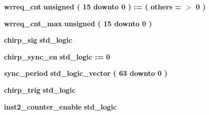\begin{DoxyCompactItemize}
\item 
{\bf wrreq\+\_\+cnt} {\bfseries \textcolor{comment}{unsigned}\textcolor{vhdlchar}{ }\textcolor{vhdlchar}{(}\textcolor{vhdlchar}{ }\textcolor{vhdlchar}{ } \textcolor{vhdldigit}{15} \textcolor{vhdlchar}{ }\textcolor{keywordflow}{downto}\textcolor{vhdlchar}{ }\textcolor{vhdlchar}{ } \textcolor{vhdldigit}{0} \textcolor{vhdlchar}{ }\textcolor{vhdlchar}{)}\textcolor{vhdlchar}{ }\textcolor{vhdlchar}{ }\textcolor{vhdlchar}{ }\textcolor{vhdlchar}{\+:}\textcolor{vhdlchar}{=}\textcolor{vhdlchar}{ }\textcolor{vhdlchar}{(}\textcolor{vhdlchar}{ }\textcolor{vhdlchar}{ }\textcolor{keywordflow}{others}\textcolor{vhdlchar}{ }\textcolor{vhdlchar}{ }\textcolor{vhdlchar}{=}\textcolor{vhdlchar}{ }\textcolor{vhdlchar}{$>$}\textcolor{vhdlchar}{ }\textcolor{vhdlchar}{\textquotesingle{}}\textcolor{vhdlchar}{ } \textcolor{vhdldigit}{0} \textcolor{vhdlchar}{ }\textcolor{vhdlchar}{\textquotesingle{}}\textcolor{vhdlchar}{ }\textcolor{vhdlchar}{)}\textcolor{vhdlchar}{ }} 
\item 
{\bf wrreq\+\_\+cnt\+\_\+max} {\bfseries \textcolor{comment}{unsigned}\textcolor{vhdlchar}{ }\textcolor{vhdlchar}{(}\textcolor{vhdlchar}{ }\textcolor{vhdlchar}{ } \textcolor{vhdldigit}{15} \textcolor{vhdlchar}{ }\textcolor{keywordflow}{downto}\textcolor{vhdlchar}{ }\textcolor{vhdlchar}{ } \textcolor{vhdldigit}{0} \textcolor{vhdlchar}{ }\textcolor{vhdlchar}{)}\textcolor{vhdlchar}{ }} 
\item 
{\bf chirp\+\_\+sig} {\bfseries \textcolor{comment}{std\+\_\+logic}\textcolor{vhdlchar}{ }} 
\item 
{\bf chirp\+\_\+sync\+\_\+en} {\bfseries \textcolor{comment}{std\+\_\+logic}\textcolor{vhdlchar}{ }\textcolor{vhdlchar}{ }\textcolor{vhdlchar}{\+:}\textcolor{vhdlchar}{=}\textcolor{vhdlchar}{ }\textcolor{vhdlchar}{ }\textcolor{vhdlchar}{\textquotesingle{}}\textcolor{vhdlchar}{ } \textcolor{vhdldigit}{0} \textcolor{vhdlchar}{ }\textcolor{vhdlchar}{\textquotesingle{}}\textcolor{vhdlchar}{ }} 
\item 
{\bf sync\+\_\+period} {\bfseries \textcolor{comment}{std\+\_\+logic\+\_\+vector}\textcolor{vhdlchar}{ }\textcolor{vhdlchar}{(}\textcolor{vhdlchar}{ }\textcolor{vhdlchar}{ } \textcolor{vhdldigit}{63} \textcolor{vhdlchar}{ }\textcolor{keywordflow}{downto}\textcolor{vhdlchar}{ }\textcolor{vhdlchar}{ } \textcolor{vhdldigit}{0} \textcolor{vhdlchar}{ }\textcolor{vhdlchar}{)}\textcolor{vhdlchar}{ }} 
\item 
{\bf chirp\+\_\+trig} {\bfseries \textcolor{comment}{std\+\_\+logic}\textcolor{vhdlchar}{ }} 
\item 
{\bf inst2\+\_\+counter\+\_\+enable} {\bfseries \textcolor{comment}{std\+\_\+logic}\textcolor{vhdlchar}{ }} 
\end{DoxyCompactItemize}
